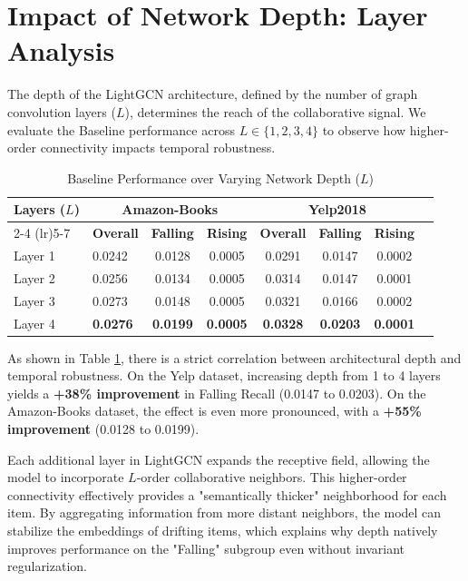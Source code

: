 \documentclass{article}
\begin{document}
\section{Impact of Network Depth: Layer Analysis}
The depth of the LightGCN architecture, defined by the number of graph convolution layers ($L$), determines the reach of the collaborative signal. We evaluate the Baseline performance across $L \in \{1, 2, 3, 4\}$ to observe how higher-order connectivity impacts temporal robustness.

\begin{table}[h]
    \centering
    \caption{Baseline Performance over Varying Network Depth ($L$)}
    \label{tab:layer_ablation}
    \begin{tabular}{llcccccc}
        \toprule
        \multirow{2}{*}{\textbf{Layers ($L$)}} & \multicolumn{3}{c}{\textbf{Amazon-Books}} & \multicolumn{3}{c}{\textbf{Yelp2018}} \\
        \cmidrule(lr){2-4} \cmidrule(lr){5-7}
        & \textbf{Overall} & \textbf{Falling} & \textbf{Rising} & \textbf{Overall} & \textbf{Falling} & \textbf{Rising} \\
        \midrule
        Layer 1 & 0.0242 & 0.0128 & 0.0005 & 0.0291 & 0.0147 & 0.0002 \\
        Layer 2 & 0.0256 & 0.0134 & 0.0005 & 0.0314 & 0.0147 & 0.0001 \\
        Layer 3 & 0.0273 & 0.0148 & 0.0005 & 0.0321 & 0.0166 & 0.0002 \\
        Layer 4 & \textbf{0.0276} & \textbf{0.0199} & \textbf{0.0005} & \textbf{0.0328} & \textbf{0.0203} & \textbf{0.0001} \\
        \bottomrule
    \end{tabular}
\end{table}

As shown in Table \ref{tab:layer_ablation}, there is a strict correlation between architectural depth and temporal robustness. On the Yelp dataset, increasing depth from 1 to 4 layers yields a \textbf{+38\% improvement} in Falling Recall (0.0147 to 0.0203). On the Amazon-Books dataset, the effect is even more pronounced, with a \textbf{+55\% improvement} (0.0128 to 0.0199). 

Each additional layer in LightGCN expands the receptive field, allowing the model to incorporate $L$-order collaborative neighbors. This higher-order connectivity effectively provides a "semantically thicker" neighborhood for each item. By aggregating information from more distant neighbors, the model can stabilize the embeddings of drifting items, which explains why depth natively improves performance on the "Falling" subgroup even without invariant regularization.
\end{document}
